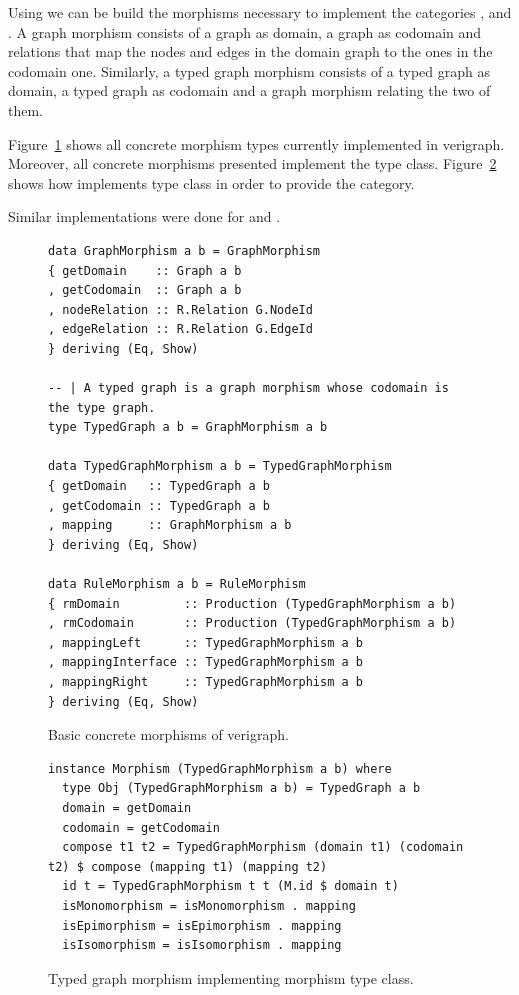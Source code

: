 Using  we can be build the morphisms necessary to implement the categories ,  and . A graph morphism consists of a graph as domain, a graph as codomain and relations that map the nodes and edges in the domain graph to the ones in the codomain one. Similarly, a typed graph morphism consists of a typed graph as domain, a typed graph as codomain and a graph morphism relating the two of them.

Figure~\ref{fig:verigraph:concrete-morphisms} shows all concrete morphism types currently implemented in verigraph. Moreover, all concrete morphisms presented implement the  type class. Figure~\ref{fig:verigraph:morphism-implementation} shows how  implements  type class in order to provide the  category.

Similar implementations were done for  and .

\begin{figure}[!ht]
\caption{Basic concrete morphisms of verigraph.}
\begin{verbatim}
data GraphMorphism a b = GraphMorphism 
{ getDomain    :: Graph a b
, getCodomain  :: Graph a b
, nodeRelation :: R.Relation G.NodeId
, edgeRelation :: R.Relation G.EdgeId
} deriving (Eq, Show)

-- | A typed graph is a graph morphism whose codomain is the type graph.
type TypedGraph a b = GraphMorphism a b

data TypedGraphMorphism a b = TypedGraphMorphism 
{ getDomain   :: TypedGraph a b
, getCodomain :: TypedGraph a b
, mapping     :: GraphMorphism a b
} deriving (Eq, Show)

data RuleMorphism a b = RuleMorphism 
{ rmDomain         :: Production (TypedGraphMorphism a b)
, rmCodomain       :: Production (TypedGraphMorphism a b)
, mappingLeft      :: TypedGraphMorphism a b
, mappingInterface :: TypedGraphMorphism a b
, mappingRight     :: TypedGraphMorphism a b
} deriving (Eq, Show)
\end{verbatim}
\label{fig:verigraph:concrete-morphisms}
\end{figure}

\begin{figure}[!ht]
\caption{Typed graph morphism implementing morphism type class.}
\begin{verbatim}
instance Morphism (TypedGraphMorphism a b) where
  type Obj (TypedGraphMorphism a b) = TypedGraph a b
  domain = getDomain
  codomain = getCodomain
  compose t1 t2 = TypedGraphMorphism (domain t1) (codomain t2) $ compose (mapping t1) (mapping t2)
  id t = TypedGraphMorphism t t (M.id $ domain t)
  isMonomorphism = isMonomorphism . mapping
  isEpimorphism = isEpimorphism . mapping
  isIsomorphism = isIsomorphism . mapping

\end{verbatim}
\label{fig:verigraph:morphism-implementation}
\end{figure}

